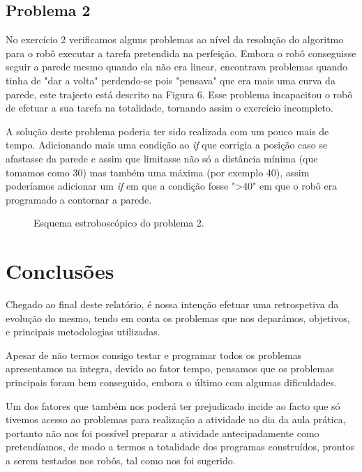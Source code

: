 \documentclass[a4paper, 12pt, onecolumn, oneside]{report}
\begin{document}
\newpage

\subsection{Problema 2}
No exercício 2 verificamos alguns problemas ao nível da resolução do algoritmo para o robô executar a tarefa pretendida na perfeição. Embora o robô conseguisse seguir a parede mesmo quando ela não era linear, encontrava problemas quando tinha de "dar a volta" perdendo-se pois "pensava" que era mais uma curva da parede, este trajecto está descrito na Figura 6.  Esse problema incapacitou o robô de efetuar a sua tarefa na totalidade, tornando assim o exercício incompleto.

A solução deste problema poderia ter sido realizada com um pouco mais de tempo. Adicionando mais uma condição ao \emph{if} que corrigia a posição caso se afastasse da parede e assim que limitasse não só a distância mínima (que tomamos como 30) mas também uma máxima (por exemplo 40), assim poderíamos adicionar um \emph{if} em que a condição fosse ">40" em que o robô era programado a contornar a parede.





\begin{figure}[H]
\caption{Esquema estroboscópico do problema 2.}
\label{fig:speciation}
\end{figure}





 \newpage

\section{Conclusões}




Chegado ao final deste relatório, é nossa intenção efetuar uma retrospetiva da evolução do mesmo, tendo em conta os problemas que nos deparámos, objetivos, e principais metodologias utilizadas.

Apesar de não termos consigo testar e programar todos os problemas apresentamos na integra, devido ao fator tempo, pensamos que os problemas principais foram bem conseguido, embora o último com algumas dificuldades.


Um dos fatores que também nos poderá ter prejudicado incide ao facto que só tivemos acesso ao problemas para realização a atividade no dia da aula prática, portanto não nos foi possível preparar a atividade antecipadamente como pretendíamos, de modo a termos a totalidade dos programas construídos, prontos a serem testados nos robôs, tal como nos foi sugerido.
\end{document}
